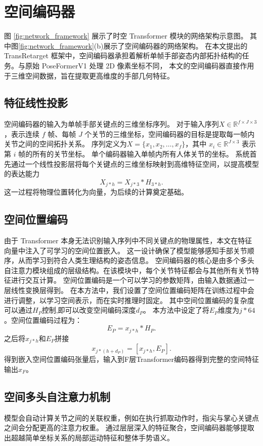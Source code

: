 \section{空间编码器}
图 \ref{fig:network_framework} 展示了时空 Transformer 模块的网络架构示意图。
其中图\ref{fig:network_framework}(b)展示了空间编码器的网络架构。
在本文提出的 TransRetarget 框架中，空间编码器承担着解析单帧手部姿态内部拓扑结构的任务。与原始 PoseFormerV1 处理 2D 像素坐标不同，
本文的空间编码器直接作用于三维空间数据，旨在提取更高维度的手部几何特征。
\subsection{特征线性投影}
空间编码器的输入为单帧手部关键点的三维坐标序列。
对于输入序列$X \in \mathbb{R}^{f \times J \times 3}$，表示连续 $f$ 帧、每帧 $J$ 个关节的三维坐标，空间编码器的目标是提取每一帧内关节之间的空间拓扑关系。
序列定义为$X = \{x_1, x_2, \ldots, x_f\}$，其中 $x_i \in \mathbb{R}^{J \times 3}$ 表示第 $i$ 帧的所有的关节坐标。
单个编码器输入单帧内所有人体关节的坐标。
系统首先通过一个线性投影层将每个关键点的三维坐标映射到高维特征空间，以提高模型的表达能力
\begin{equation}
X_{j*h} = X_{j*3} * H_{3*h}.
\end{equation}
这一过程将物理位置转化为向量，为后续的计算奠定基础。
\subsection{空间位置编码}
由于 Transformer 本身无法识别输入序列中不同关键点的物理属性，本文在特征向量中注入了可学习的空间位置嵌入。
这一设计确保了模型能够感知手部关节顺序，从而学习到符合人类生理结构的姿态信息。
空间编码器的核心是由多个多头自注意力模块组成的层级结构。在该模块中，每个关节特征都会与其他所有关节特征进行交互计算。
空间位置编码是一个可以学习的参数矩阵，由输入数据通过一层线性变换层得到。
在本方法中，我们设置了空间位置编码矩阵在训练过程中会进行调整，以学习空间表示，而在实时推理时固定。
其中空间位置编码的复杂度可以通过$H_{P}$控制,即可以改变空间编码深度$d_{P}$。
本方法中设定了将$E_{P}$维度为$j*64$。空间位置编码过程为：
\begin{equation}
E_{P} = x_{j*h} * H_{P}.
\end{equation}
之后将$x_{j*h}$和$E_{P}$拼接
\begin{equation}
x_{j*(h+d_{P})} = [x_{j*h} , E_{P}].
\end{equation}
得到嵌入空间位置编码张量后，输入到F层Transformer编码器得到完整的空间特征输出$x_F$。
\subsection{空间多头自注意力机制}
模型会自动计算关节之间的关联权重，例如在执行抓取动作时，指尖与掌心关键点之间会分配更高的注意力权重。
通过层层深入的特征聚合，空间编码器能够提取出超越简单坐标关系的局部运动特征和整体手势语义。

